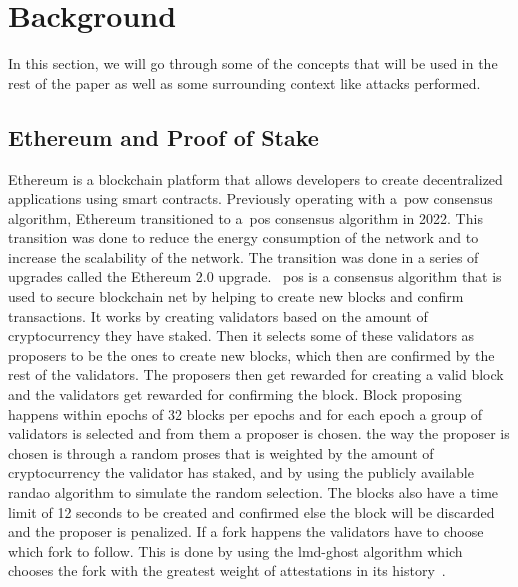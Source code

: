 
\section{Background}\label{sec:background}
In this section, we will go through some of the concepts that will be used in the rest of the paper as well as some surrounding context like attacks performed.

\subsection{Ethereum and Proof of Stake}\label{subsec:ethereum-and-proof-of-stake}
Ethereum is a blockchain platform that allows developers to create decentralized applications using smart contracts.
Previously operating with a~\gls{pow} consensus algorithm, Ethereum transitioned to a~\gls{pos} consensus algorithm in 2022.
This transition was done to reduce the energy consumption of the network and to increase the scalability of the network.
The transition was done in a series of upgrades called the Ethereum 2.0 upgrade.
~\gls{pos} is a consensus algorithm that is used to secure blockchain net by helping to create new blocks and confirm transactions.
It works by creating validators based on the amount of cryptocurrency they have staked.
Then it selects some of these validators as proposers to be the ones to create new blocks, which then are confirmed by the rest of the validators.
The proposers then get rewarded for creating a valid block and the validators get rewarded for confirming the block.
Block proposing happens within epochs of 32 blocks per epochs and for each epoch a group of validators is selected and from them a proposer is chosen.
the way the proposer is chosen is through a random proses that is weighted by the amount of cryptocurrency the validator has staked, and by using the publicly available \gls{randao} algorithm to simulate the random selection.
The blocks also have a time limit of 12 seconds to be created and confirmed else the block will be discarded and the proposer is penalized.
If a fork happens the validators have to choose which fork to follow.
This is done by using the \gls{lmd-ghost} algorithm which chooses the fork with the greatest weight of attestations in its history~\cite{EthereumProof-of-stakePoS}.


